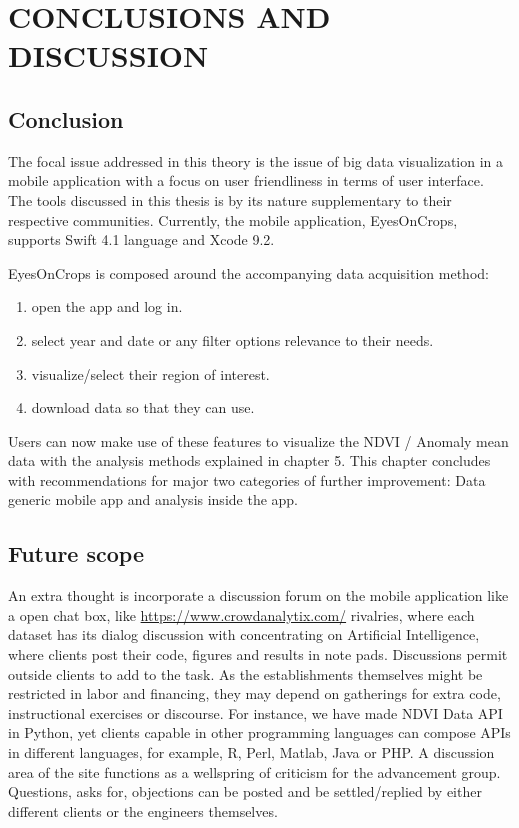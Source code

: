 \chapter{CONCLUSIONS AND DISCUSSION}
\label{chap:conclusion}

\section{Conclusion}

The focal issue addressed in this theory is the issue of big data visualization in a mobile application with a focus on user friendliness in terms of user interface. The tools discussed in this thesis is by its nature supplementary to their respective communities. Currently, the mobile application, EyesOnCrops, supports Swift 4.1 language and Xcode 9.2.

EyesOnCrops is composed around the accompanying data acquisition method:
\begin{enumerate}
  \item open the app and log in. 
  \item select year and date or any filter options relevance to their needs.
  \item visualize/select their region of interest.
  \item download data so that they can use.
\end{enumerate}

Users can now make use of these features to visualize the NDVI / Anomaly mean data with the analysis methods explained in chapter 5. 
This chapter concludes with recommendations for major two
categories of further improvement: Data generic mobile app and analysis inside the app.

\section{Future scope}

An extra thought is incorporate a discussion forum on the mobile application like a open chat box, like \url{https://www.crowdanalytix.com/} rivalries, where each dataset has its dialog discussion with concentrating on Artificial Intelligence, where clients post their code, figures and results in note pads. Discussions permit outside clients to add to the task. As the establishments themselves might be restricted in labor and financing, they may depend on gatherings for extra code, instructional exercises or discourse. For instance, we have made NDVI Data API in Python, yet clients capable in other programming languages can compose APIs in different languages, for example, R, Perl, Matlab, Java or PHP. A discussion area of the site functions as a wellspring of criticism for the advancement group. Questions, asks for, objections can be posted and be settled/replied by either different clients or the engineers themselves. \\

